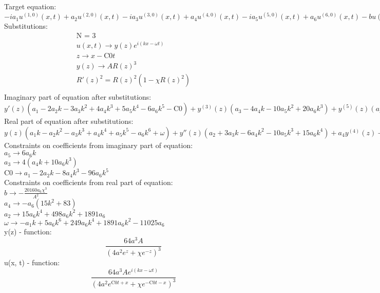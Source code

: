 \documentclass[12pt,a4paper,draft]{article}
\begin{document}
Target equation:
\\$
-i a_{1} u^{(1,0)}(x,t)+a_{2} u^{(2,0)}(x,t)-i a_{3} u^{(3,0)}(x,t)+a_{4} u^{(4,0)}(x,t)-i a_{5} u^{(5,0)}(x,t)+a_{6} u^{(6,0)}(x,t)-b u(x,t) \left| u(x,t)\right| ^2+i u^{(0,1)}(x,t)=0
$\\
Substitutions:
$$
\begin{array}{c}
 \text{N = 3} \\
 u(x,t)\to y(z) e^{i (k x-\omega  t)} \\
 z\to x-\text{C0} t \\
 y(z)\to A R(z)^3 \\
 R'(z)^2=R(z)^2 \left(1-\chi  R(z)^2\right) \\
\end{array}
$$
Imaginary part of equation after substitutions:
\\$
y'(z) \left(a_{1}-2 a_{2} k-3 a_{3} k^2+4 a_{4} k^3+5 a_{5} k^4-6 a_{6} k^5-\text{C0}\right)+y^{(3)}(z) \left(a_{3}-4 a_{4} k-10 a_{5} k^2+20 a_{6} k^3\right)+y^{(5)}(z) (a_{5}-6 a_{6} k)=0
$\\
Real part of equation after substitutions:
\\$
y(z) \left(a_{1} k-a_{2} k^2-a_{3} k^3+a_{4} k^4+a_{5} k^5-a_{6} k^6+\omega \right)+y''(z) \left(a_{2}+3 a_{3} k-6 a_{4} k^2-10 a_{5} k^3+15 a_{6} k^4\right)+a_{4} y^{(4)}(z)+5 a_{5} k y^{(4)}(z)-15 a_{6} k^2 y^{(4)}(z)+a_{6} y^{(6)}(z)-b y(z)^3=0
$\\
Constraints on coefficients from imaginary part of equation:
\\$a_{5}\to 6 a_{6} k$\\
$a_{3}\to 4 \left(a_{4} k+10 a_{6} k^3\right)$\\
$\text{C0}\to a_{1}-2 a_{2} k-8 a_{4} k^3-96 a_{6} k^5$\\
Constraints on coefficients from real part of equation:
\\$b\to -\frac{20160 a_{6} \chi ^3}{A^2}$\\
$a_{4}\to -a_{6} \left(15 k^2+83\right)$\\
$a_{2}\to 15 a_{6} k^4+498 a_{6} k^2+1891 a_{6}$\\
$\omega \to -a_{1} k+5 a_{6} k^6+249 a_{6} k^4+1891 a_{6} k^2-11025 a_{6}$\\


y(z) - function:
$$
\frac{64 a^3 A}{\left(4 a^2 e^z+\chi  e^{-z}\right)^3}
$$
u(x, t) - function:
$$
\frac{64 a^3 A e^{i (k x-\omega  t)}}{\left(4 a^2 e^{\text{C0} t+x}+\chi  e^{-\text{C0} t-x}\right)^3}
$$
\end{document}
